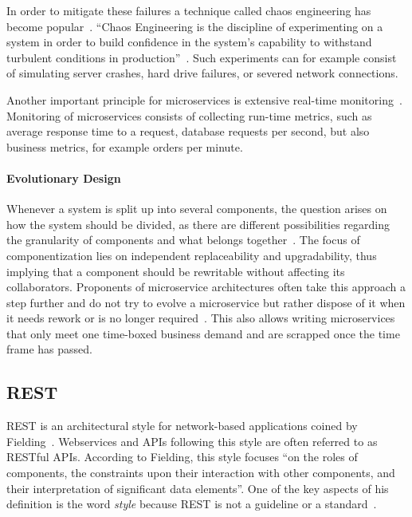 In order to mitigate these failures a technique called chaos engineering has become popular~\cite{CEC2018}.
``Chaos Engineering is the discipline of experimenting on a system in order to build confidence in the system's capability to withstand turbulent conditions in production''~\cite{CEC2018}.
Such experiments can for example consist of simulating server crashes, hard drive failures, or severed network connections.

Another important principle for microservices is extensive real-time monitoring~\cite{Lewis2014}.
Monitoring of microservices consists of collecting run-time metrics, such as average response time to a request, database requests per second, but also business metrics, for example orders per minute.

\paragraph{Evolutionary Design}

Whenever a system is split up into several components, the question arises on how the system should be divided, as there are different possibilities regarding the granularity of components and what belongs together~\cite{Lewis2014}.
The focus of componentization lies on independent replaceability and upgradability, thus implying that a component should be rewritable without affecting its collaborators.
Proponents of microservice architectures often take this approach a step further and do not try to evolve a microservice but rather dispose of it when it needs rework or is no longer required~\cite{Fowler2016,Lewis2014}.
This also allows writing microservices that only meet one time-boxed business demand and are scrapped once the time frame has passed.

\subsection{\acf{REST}}\label{sec:rest}

\ac{REST} is an architectural style for network-based applications coined by Fielding~\cite{Fielding2000}.
Webservices and \acp{API} following this style are often referred to as \acs{REST}ful \acp{API}.
According to Fielding, this style focuses ``on the roles of components, the constraints upon their interaction with other components, and their interpretation of significant data elements''.
One of the key aspects of his definition is the word \textit{style} because \ac{REST} is not a guideline or a standard~\cite{Malakhov2018}.

